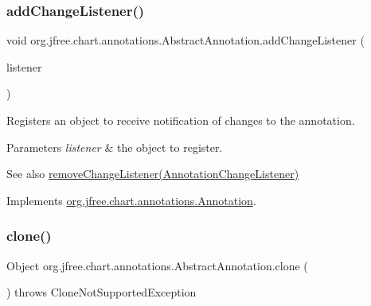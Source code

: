 \subsubsection{\texorpdfstring{add\+Change\+Listener()}{addChangeListener()}}
{\footnotesize\ttfamily void org.\+jfree.\+chart.\+annotations.\+Abstract\+Annotation.\+add\+Change\+Listener (\begin{DoxyParamCaption}\item[{\mbox{\hyperlink{interfaceorg_1_1jfree_1_1chart_1_1event_1_1_annotation_change_listener}{Annotation\+Change\+Listener}}}]{listener }\end{DoxyParamCaption})}

Registers an object to receive notification of changes to the annotation.


\begin{DoxyParams}{Parameters}
{\em listener} & the object to register.\\
\hline
\end{DoxyParams}
\begin{DoxySeeAlso}{See also}
\mbox{\hyperlink{classorg_1_1jfree_1_1chart_1_1annotations_1_1_abstract_annotation_a35d547ca28248732aa2a7935ab41f33e}{remove\+Change\+Listener(\+Annotation\+Change\+Listener)}} 
\end{DoxySeeAlso}


Implements \mbox{\hyperlink{interfaceorg_1_1jfree_1_1chart_1_1annotations_1_1_annotation_aea28c7e0fd5dfce175da8303f85d449a}{org.\+jfree.\+chart.\+annotations.\+Annotation}}.

\mbox{\label{classorg_1_1jfree_1_1chart_1_1annotations_1_1_abstract_annotation_a8ce423f6423f21f6f812d7b49f21358f}} 
\subsubsection{\texorpdfstring{clone()}{clone()}}
{\footnotesize\ttfamily Object org.\+jfree.\+chart.\+annotations.\+Abstract\+Annotation.\+clone (\begin{DoxyParamCaption}{ }\end{DoxyParamCaption}) throws Clone\+Not\+Supported\+Exception}

